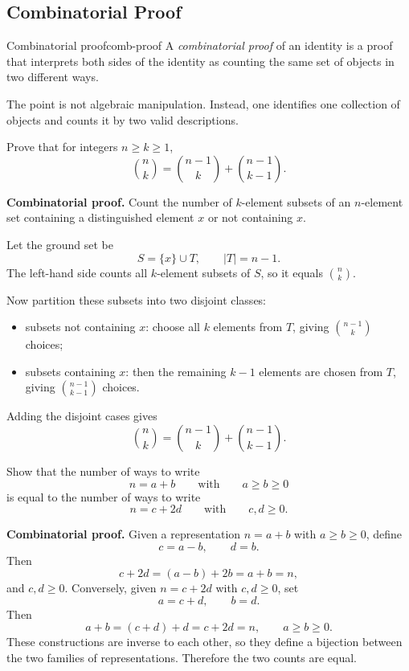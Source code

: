 \subsection{Combinatorial Proof}

\begin{definition}{Combinatorial proof}{comb-proof}
A \emph{combinatorial proof} of an identity is a proof that interprets both sides of the identity as counting the same set of objects in two different ways.
\end{definition}

The point is not algebraic manipulation. Instead, one identifies one collection of objects and counts it by two valid descriptions.

\begin{examplebox}[title={Pascal identity}]
Prove that for integers $n\ge k\ge 1$,
\[
\binom{n}{k}=\binom{n-1}{k}+\binom{n-1}{k-1}.
\]

\textbf{Combinatorial proof.}
Count the number of $k$-element subsets of an $n$-element set containing a distinguished element $x$ or not containing $x$.

Let the ground set be
\[
S=\{x\}\cup T,
\qquad |T|=n-1.
\]
The left-hand side counts all $k$-element subsets of $S$, so it equals $\binom{n}{k}$.

Now partition these subsets into two disjoint classes:
\begin{itemize}[leftmargin=*]
    \item subsets not containing $x$: choose all $k$ elements from $T$, giving $\binom{n-1}{k}$ choices;
    \item subsets containing $x$: then the remaining $k-1$ elements are chosen from $T$, giving $\binom{n-1}{k-1}$ choices.
\end{itemize}
Adding the disjoint cases gives
\[
\binom{n}{k}=\binom{n-1}{k}+\binom{n-1}{k-1}.
\]
\end{examplebox}

\begin{examplebox}[title={An equality of two partition counts}]
Show that the number of ways to write
\[
n=a+b
\qquad\text{with}\qquad a\ge b\ge 0
\]
is equal to the number of ways to write
\[
n=c+2d
\qquad\text{with}\qquad c,d\ge 0.
\]

\textbf{Combinatorial proof.}
Given a representation $n=a+b$ with $a\ge b\ge 0$, define
\[
c=a-b,\qquad d=b.
\]
Then
\[
c+2d=(a-b)+2b=a+b=n,
\]
and $c,d\ge 0$. Conversely, given $n=c+2d$ with $c,d\ge 0$, set
\[
a=c+d,\qquad b=d.
\]
Then
\[
a+b=(c+d)+d=c+2d=n,
\qquad a\ge b\ge 0.
\]
These constructions are inverse to each other, so they define a bijection between the two families of representations. Therefore the two counts are equal.
\end{examplebox}


